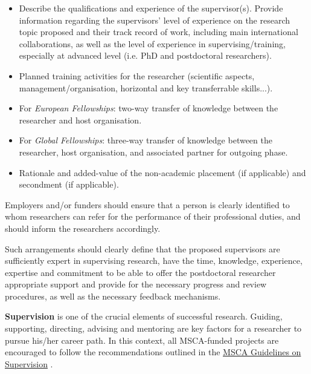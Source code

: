 \documentclass[12pt,draftproposal]{msca-pf}
\begin{document}
\begin{itemize}
    \item Describe the qualifications and experience of the supervisor(s).
    Provide information regarding the supervisors' level of experience on the
    research topic proposed and their track record of work, including main
    international collaborations, as well as the level of experience in
    supervising/training, especially at advanced level (i.e. PhD and postdoctoral
    researchers).

    \item Planned training activities for the researcher (scientific aspects,
    management/organisation, horizontal and key transferrable skills...).

    \item For \emph{European Fellowships}: two-way transfer of knowledge between
    the researcher and host organisation.

    \item For \emph{Global Fellowships}: three-way transfer of knowledge between
    the researcher, host organisation, and associated partner for outgoing phase.

    \item Rationale and added-value of the non-academic placement (if applicable)
    and secondment (if applicable).
\end{itemize}

Employers and/or funders should ensure that a person is clearly identified to
whom researchers can refer for the performance of their professional duties, and
should inform the researchers accordingly.

Such arrangements should clearly define that the proposed supervisors are
sufficiently expert in supervising research, have the time, knowledge, experience,
expertise and commitment to be able to offer the postdoctoral researcher
appropriate support and provide for the necessary progress and review procedures,
as well as the necessary feedback mechanisms.

\textbf{Supervision} is one of the crucial elements of successful research. Guiding,
supporting, directing, advising and mentoring are key factors for a researcher
to pursue his/her career path. In this context, all MSCA-funded projects are
encouraged to follow the recommendations outlined in the
\href{https://data.europa.eu/doi/10.2766/508311}{MSCA Guidelines on Supervision}
\footnotemark{}.

\end{document}
